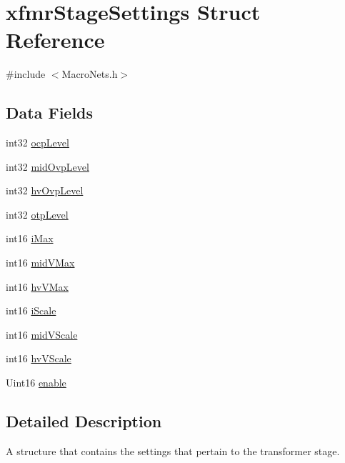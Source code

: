 \hypertarget{a00010}{\section{xfmr\-Stage\-Settings Struct Reference}
\label{a00010}
}


{\ttfamily \#include $<$Macro\-Nets.\-h$>$}

\subsection*{Data Fields}
\begin{DoxyCompactItemize}
\item 
int32 \hyperlink{a00010_a99d85a680a0b0b7f1858d77a3ac216b3}{ocp\-Level}
\item 
int32 \hyperlink{a00010_a40270e88484faa165e3e73f45c08326a}{mid\-Ovp\-Level}
\item 
int32 \hyperlink{a00010_a311d7915ed53ed668964b7664df881c0}{hv\-Ovp\-Level}
\item 
int32 \hyperlink{a00010_a582f0218997b0b37f365b75ae274e67c}{otp\-Level}
\item 
int16 \hyperlink{a00010_a7f041e2df9592fb461a013cdb67af348}{i\-Max}
\item 
int16 \hyperlink{a00010_a251fa7af71c610bf2b193afde33e1338}{mid\-V\-Max}
\item 
int16 \hyperlink{a00010_a55b65a695862a846307f5131b1220cbe}{hv\-V\-Max}
\item 
int16 \hyperlink{a00010_a3b4f123000ae32ca041c6286e5c92fd4}{i\-Scale}
\item 
int16 \hyperlink{a00010_a44cb584d774e345422c57cc155b65d0c}{mid\-V\-Scale}
\item 
int16 \hyperlink{a00010_a3a22ae7b7c6bf805037d571fce3652b8}{hv\-V\-Scale}
\item 
Uint16 \hyperlink{a00010_aef5e40360d79d34e95c2b412d4e4063b}{enable}
\end{DoxyCompactItemize}


\subsection{Detailed Description}
A structure that contains the settings that pertain to the transformer stage. 

